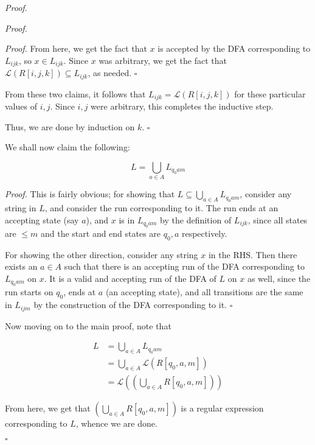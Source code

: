 \documentclass[a4paper]{article}
\newenvironment{proof}{\begin{breakbox}\textit{Proof.}}{\hfill$\square$\end{breakbox}}
\newcommand{\mc}{\mathcal}
\renewcommand{\L}{\mc{L}}
\begin{document}
\begin{proof}
\begin{proof}
\begin{enumerate}
\begin{proof}
                        From here, we get the fact that $x$ is accepted by the DFA corresponding to $L_{ijk}$, so $x \in L_{ijk}$. Since $x$ was arbitrary, we get the fact that $\L(R[i, j, k])
                        \subseteq L_{ijk}$, as needed.
                    \end{proof}
                    From these two claims, it follows that $L_{ijk} = \L(R[i, j, k])$ for these particular values of $i, j$. Since $i, j$ were arbitrary, this completes the inductive step.
            \end{enumerate}
            Thus, we are done by induction on $k$.
        \end{proof}

        We shall now claim the following:\\

        \begin{claim}
            $$L = \bigcup_{a\in A} L_{q_0am}$$
        \end{claim}

        \begin{proof}
            This is fairly obvious; for showing that $\displaystyle L \subseteq \bigcup_{a\in A} L_{q_0am}$, consider any string in $L$, and consider the run corresponding to it. The run ends at an
            accepting state (say $a$), and $x$ is in $L_{q_0am}$ by the definition of $L_{ijk}$, since all states are $\le m$ and the start and end states are $q_0, a$ respectively.

            For showing the other direction, consider any string $x$ in the RHS. Then there exists an $a \in A$ such that there is an accepting run of the DFA corresponding to $L_{q_0am}$ on $x$. It is a
            valid and accepting run of the DFA of $L$ on $x$ as well, since the run starts on $q_0$, ends at $a$ (an accepting state), and all transitions are the same in $L_{ijm}$ by the construction of the DFA
            corresponding to it.
        \end{proof}

        Now moving on to the main proof, note that 

        \begin{align*}
            L &= \bigcup_{a\in A} L_{q_0am} \\
              &= \bigcup_{a \in A} \L(R[q_0, a, m])\\
              &= \L\left(\left(\bigcup_{a \in A} R[q_0, a, m]\right)\right)
        \end{align*}

        From here, we get that $\displaystyle \left(\bigcup_{a \in A} R[q_0, a, m]\right)$ is a regular expression corresponding to $L$, whence we are done.

    \end{proof}

    
\end{document}
